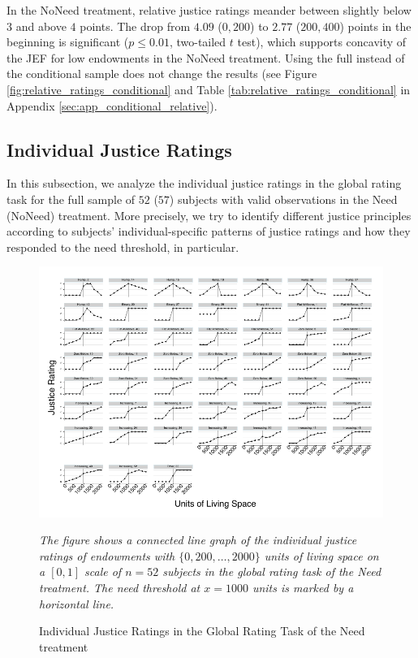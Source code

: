\documentclass[12pt]{scrartcl}
\begin{document}
In the NoNeed treatment, relative justice ratings meander between slightly below $3$ and above $4$ points.
The drop from $4.09$ ($0,200$) to $2.77$ ($200,400$) points in the beginning is significant ($p\le 0.01$, two-tailed $t$ test), which supports concavity of the JEF for low endowments in the NoNeed treatment.
Using the full instead of the conditional sample does not change the results (see Figure \ref{fig:relative_ratings_conditional} and Table \ref{tab:relative_ratings_conditional} in Appendix \ref{sec:app_conditional_relative}).


\subsection{Individual Justice Ratings}\label{sec:individual}
\noindent In this subsection, we analyze the individual justice ratings in the global rating task for the full sample of $52$ ($57$) subjects with valid observations in the Need (NoNeed) treatment.
More precisely, we try to identify different justice principles according to subjects' individual-specific patterns of justice ratings and how they responded to the need threshold, in particular.

\begin{landscape}
\begin{figure}
   \centering
   \includegraphics{figures/figure_3.pdf}
   \begin{minipage}{0.7\linewidth}
      \footnotesize
      \textit{The figure shows a connected line graph of the individual justice ratings of endowments with $\{0,200,\ldots,2000\}$ units of living space on a $[0,1]$ scale of $n=52$ subjects in the global rating task of the Need treatment. The need threshold at $x=1000$ units is marked by a horizontal line.}
   \end{minipage}
   \caption{Individual Justice Ratings in the Global Rating Task of the Need treatment}
   \label{fig:individual_need}
\end{figure}
\end{landscape}
\end{document}
